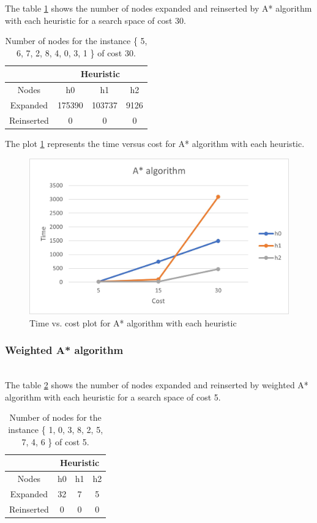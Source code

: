 \documentclass[runningheads]{llncs}
\begin{document}
The table \ref{tab:table3} shows the number of nodes expanded and reinserted by A* algorithm with each heuristic for a search space of cost 30.
\begin{table}
    \centering
\caption{\label{tab:table3}Number of nodes for the instance \{ 5, 6, 7, 2, 8, 4, 0, 3, 1 \} of cost 30.}
    \begin{tabular}{|c|c|c|c|}
    \hline
       & \multicolumn{3}{|c|}{Heuristic} \\ \hline
        Nodes & h0 & h1 & h2 \\ \hline
        Expanded & 175390 & 103737 & 9126 \\ \hline
        Reinserted & 0 & 0 & 0 \\ \hline
    \end{tabular}
\end{table}

The plot \ref{fig:astar} represents the time versus cost for A* algorithm with each heuristic.
\begin{figure}[H]
    \centering
    \includegraphics{AStarTimes.jpg}
    \caption{Time vs. cost plot for A* algorithm with each heuristic}
    \label{fig:astar}
\end{figure}

\subsubsection{Weighted A* algorithm}~\\

The table \ref{tab:table4} shows the number of nodes expanded and reinserted by weighted A* algorithm with each heuristic for a search space of cost 5.
\begin{table}
    \centering
\caption{\label{tab:table4}Number of nodes for the instance \{ 1, 0, 3, 8, 2, 5, 7, 4, 6 \} of cost 5.}
    \begin{tabular}{|c|c|c|c|}
    \hline
       & \multicolumn{3}{|c|}{Heuristic} \\ \hline
        Nodes & h0 & h1 & h2 \\ \hline
        Expanded & 32 & 7 & 5 \\ \hline
        Reinserted & 0 & 0 & 0 \\ \hline
    \end{tabular}
\end{table}
\end{document}
